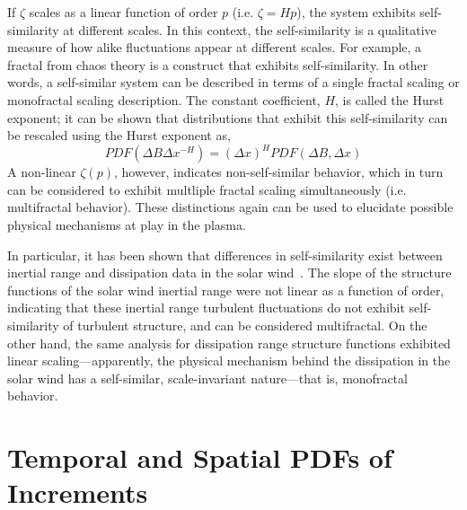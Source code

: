 \documentclass[preprint2]{aastex}
\begin{document}
If $\zeta$ scales as a linear function of order $p$ (i.e. $\zeta = Hp$), the system exhibits self-similarity at different scales. In this context, the self-similarity is a qualitative measure of how alike fluctuations appear at different scales. For example, a fractal from chaos theory is a construct that exhibits self-similarity. In other words, a self-similar system can be described in terms of a single fractal scaling or monofractal scaling description. The constant coefficient, $H$, is called the Hurst exponent; it can be shown that distributions that exhibit this self-similarity can be rescaled using the Hurst exponent as,
\begin{equation}
PDF(\Delta B\Delta x^{-H}) = (\Delta x)^HPDF(\Delta B,\Delta x)
\label{eq:scaling}
\end{equation}
A non-linear $\zeta(p)$, however, indicates non-self-similar behavior, which in turn can be considered to exhibit multliple fractal scaling simultaneously (i.e. multifractal behavior). These distinctions again can be used to elucidate possible physical mechanisms at play in the plasma. 

In particular, it has been shown that differences in self-similarity exist between inertial range and dissipation data in the solar wind~\citep{kiyani2009,kiyani2013}. The slope of the structure functions of the solar wind inertial range were not linear as a function of order, indicating that these inertial range turbulent fluctuations do not exhibit self-similarity of turbulent structure, and can be considered multifractal. On the other hand, the same analysis for dissipation range structure functions exhibited linear scaling---apparently, the physical mechanism behind the dissipation in the solar wind has a self-similar, scale-invariant nature---that is, monofractal behavior.

\section{Temporal and Spatial PDFs of Increments}\label{sec:pdfs}
\end{document}
